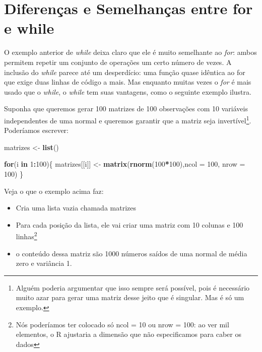\documentclass[]{book}
\newenvironment{Shaded}{\begin{snugshade}}{\end{snugshade}}
\newcommand{\KeywordTok}[1]{\textcolor[rgb]{0.13,0.29,0.53}{\textbf{#1}}}
\newcommand{\DataTypeTok}[1]{\textcolor[rgb]{0.13,0.29,0.53}{#1}}
\newcommand{\DecValTok}[1]{\textcolor[rgb]{0.00,0.00,0.81}{#1}}
\newcommand{\StringTok}[1]{\textcolor[rgb]{0.31,0.60,0.02}{#1}}
\newcommand{\ControlFlowTok}[1]{\textcolor[rgb]{0.13,0.29,0.53}{\textbf{#1}}}
\newcommand{\OperatorTok}[1]{\textcolor[rgb]{0.81,0.36,0.00}{\textbf{#1}}}
\newcommand{\NormalTok}[1]{#1}
\providecommand{\tightlist}{%
  \setlength{\itemsep}{0pt}\setlength{\parskip}{0pt}}
\let\rmarkdownfootnote\footnote%
\def\footnote{\protect\rmarkdownfootnote}
\begin{document}
\section{Diferenças e Semelhanças entre for e
while}\label{diferencas-e-semelhancas-entre-for-e-while}

O exemplo anterior de \emph{while} deixa claro que ele é muito
semelhante ao \emph{for}: ambos permitem repetir um conjunto de
operações um certo número de vezes. A inclusão do \emph{while} parece
até um desperdício: uma função quase idêntica ao for que exige duas
linhas de código a mais. Mas enquanto muitas vezes o \emph{for} é mais
usado que o \emph{while}, o \emph{while} tem suas vantagens, como o
seguinte exemplo ilustra.

Suponha que queremos gerar 100 matrizes de 100 observações com 10
variáveis independentes de uma normal e queremos garantir que a matriz
seja invertível\footnote{Alguém poderia argumentar que isso sempre será
  possível, pois é necessário muito azar para gerar uma matriz desse
  jeito que é singular. Mas é só um exemplo.}. Poderíamos escrever:

\begin{Shaded}
\begin{Highlighting}[]
\NormalTok{matrizes <-}\StringTok{ }\KeywordTok{list}\NormalTok{()}

\ControlFlowTok{for}\NormalTok{(i }\ControlFlowTok{in} \DecValTok{1}\OperatorTok{:}\DecValTok{100}\NormalTok{)\{}
\NormalTok{matrizes[[i]] <-}\StringTok{ }\KeywordTok{matrix}\NormalTok{(}\KeywordTok{rnorm}\NormalTok{(}\DecValTok{100}\OperatorTok{*}\DecValTok{100}\NormalTok{),}\DataTypeTok{ncol =} \DecValTok{100}\NormalTok{, }\DataTypeTok{nrow =} \DecValTok{100}\NormalTok{)}
\NormalTok{\}}
\end{Highlighting}
\end{Shaded}

Veja o que o exemplo acima faz:

\begin{itemize}
\tightlist
\item
  Cria uma lista vazia chamada matrizes
\item
  Para cada posição da lista, ele vai criar uma matriz com 10 colunas e
  100
  linhas\footnote{Nós poderíamos ter colocado só ncol = 10 ou nrow = 100: ao ver mil elementos, o R ajustaria a dimensão que não especificamos para caber os dados}
\item
  o conteúdo dessa matriz são 1000 números saídos de uma normal de média
  zero e variância 1.
\end{itemize}
\end{document}
